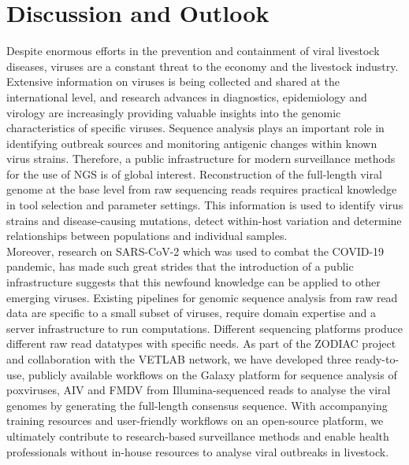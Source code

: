 \chapter{Discussion and Outlook}\label{chap:discussion}
Despite enormous efforts in the prevention and containment of viral livestock diseases, viruses are a constant threat to the economy and the livestock industry. Extensive information on viruses is being collected and shared at the international level, and research advances in diagnostics, epidemiology and virology are increasingly providing valuable insights into the genomic characteristics of specific viruses. Sequence analysis plays an important role in identifying outbreak sources and monitoring antigenic changes within known virus strains. Therefore, a public infrastructure for modern surveillance methods for the use of \ac{NGS} is of global interest. Reconstruction of the full-length viral genome at the base level from raw sequencing reads requires practical knowledge in tool selection and parameter settings. This information is used to identify virus strains and disease-causing mutations, detect within-host variation and determine relationships between populations and individual samples.\\
Moreover, research on \ac{SARS-CoV-2} which was used to combat the \ac{COVID-19} pandemic, has made such great strides that the introduction of a public infrastructure suggests that this newfound knowledge can be applied to other emerging viruses. Existing pipelines for genomic sequence analysis from raw read data are specific to a small subset of viruses, require domain expertise and a server infrastructure to run computations. Different sequencing platforms produce different raw read datatypes with specific needs. As part of the \ac{ZODIAC} project and collaboration with the \ac{VETLAB} network, we have developed three ready-to-use, publicly available workflows on the Galaxy platform for sequence analysis of poxviruses, \ac{AIV} and \ac{FMDV} from Illumina-sequenced reads to analyse the viral genomes by generating the full-length consensus sequence. With accompanying training resources and user-friendly workflows on an open-source platform, we ultimately contribute to research-based surveillance methods and enable health professionals without in-house resources to analyse viral outbreaks in livestock.

